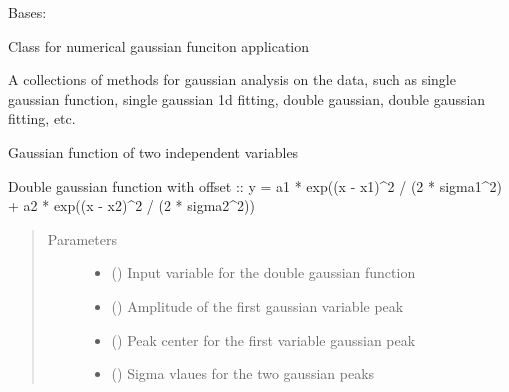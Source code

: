 \documentclass[letterpaper,10pt,english]{sphinxmanual}
\begin{document}
\begin{fulllineitems}
\label{\detokenize{scibeam.core:scibeam.core.gaussian.Gaussian}}
Bases: 

Class for numerical gaussian funciton application

A collections of methods for gaussian analysis on the data, such as
single gaussian function, single gaussian 1d fitting, double gaussian,
double gaussian fitting, etc.

\begin{fulllineitems}
\label{\detokenize{scibeam.core:scibeam.core.gaussian.Gaussian.doubleGaus}}
Gaussian function of two independent variables

Double gaussian function with offset ::
y = a1 * exp((x - x1)\textasciicircum{}2 / (2 * sigma1\textasciicircum{}2) + a2 * exp((x - x2)\textasciicircum{}2 / (2 * sigma2\textasciicircum{}2))
\begin{quote}\begin{description}
\item[{Parameters}] \leavevmode\begin{itemize}
\item {} 
 () \textendash{} Input variable for the double gaussian function

\item {} 
 () \textendash{} Amplitude of the first gaussian variable peak

\item {} 
 () \textendash{} Peak center for the first variable gaussian peak

\item {} 
 () \textendash{} Sigma vlaues for the two gaussian peaks


\end{itemize}
\end{description}
\end{quote}
\end{fulllineitems}
\end{fulllineitems}
\end{document}
